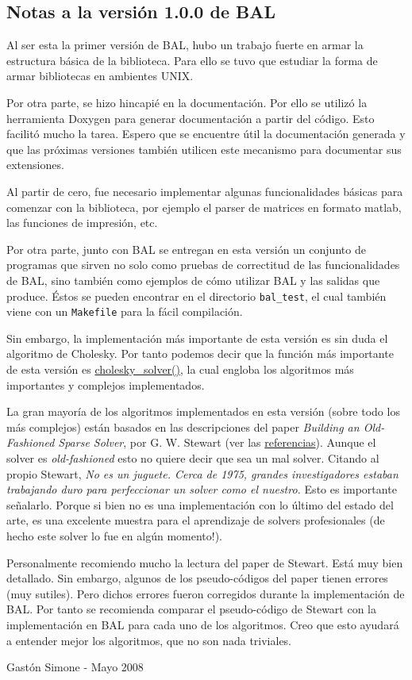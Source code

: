 \hypertarget{notasver_notasver1_0_0}{}\subsection{Notas a la versión 1.0.0 de BAL}\label{notasver_notasver1_0_0}
Al ser esta la primer versión de BAL, hubo un trabajo fuerte en armar la estructura básica de la biblioteca. Para ello se tuvo que estudiar la forma de armar bibliotecas en ambientes UNIX.

Por otra parte, se hizo hincapié en la documentación. Por ello se utilizó la herramienta Doxygen para generar documentación a partir del código. Esto facilitó mucho la tarea. Espero que se encuentre útil la documentación generada y que las próximas versiones también utilicen este mecanismo para documentar sus extensiones.

Al partir de cero, fue necesario implementar algunas funcionalidades básicas para comenzar con la biblioteca, por ejemplo el parser de matrices en formato matlab, las funciones de impresión, etc.

Por otra parte, junto con BAL se entregan en esta versión un conjunto de programas que sirven no solo como pruebas de correctitud de las funcionalidades de BAL, sino también como ejemplos de cómo utilizar BAL y las salidas que produce. Éstos se pueden encontrar en el directorio {\tt bal\_\-test}, el cual también viene con un {\tt Makefile} para la fácil compilación.

Sin embargo, la implementación más importante de esta versión es sin duda el algoritmo de Cholesky. Por tanto podemos decir que la función más importante de esta versión es \hyperlink{cholesky_8c_b61e2da86cddb63b2ef5d38b46a1d4ea}{cholesky\_\-solver()}, la cual engloba los algoritmos más importantes y complejos implementados.

La gran mayoría de los algoritmos implementados en esta versión (sobre todo los más complejos) están basados en las descripciones del paper {\em Building an Old-Fashioned Sparse Solver\/}, por G. W. Stewart (ver las \hyperlink{index_refsec}{referencias}). Aunque el solver es {\em old-fashioned\/} esto no quiere decir que sea un mal solver. Citando al propio Stewart, {\em No es un juguete. Cerca de 1975, grandes investigadores estaban trabajando duro para perfeccionar un solver como el nuestro.\/} Esto es importante señalarlo. Porque si bien no es una implementación con lo último del estado del arte, es una excelente muestra para el aprendizaje de solvers profesionales (de hecho este solver lo fue en algún momento!).

Personalmente recomiendo mucho la lectura del paper de Stewart. Está muy bien detallado. Sin embargo, algunos de los pseudo-códigos del paper tienen errores (muy sutiles). Pero dichos errores fueron corregidos durante la implementación de BAL. Por tanto se recomienda comparar el pseudo-código de Stewart con la implementación en BAL para cada uno de los algoritmos. Creo que esto ayudará a entender mejor los algoritmos, que no son nada triviales.

Gastón Simone - Mayo 2008 